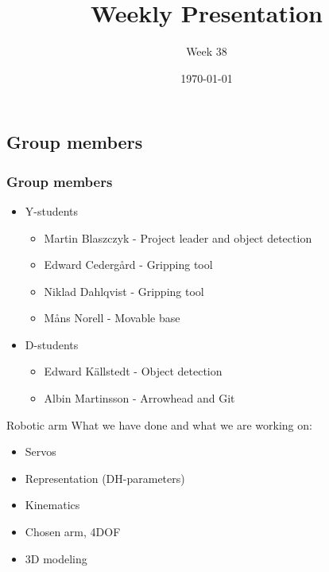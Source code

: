 \documentclass{beamer}
\title{Weekly Presentation}
\subtitle{Week 38}
\author{}
\institute{Luleå University of Technology}
\date{\today}
\begin{document}
\begin{frame}
    \titlepage
\end{frame}




\begin{frame}
    \subsection{Group members}
    \frametitle{Group members }
    \begin{itemize}
        \item Y-students
        \begin{itemize}
            \item Martin Blaszczyk - Project leader and object detection
            \item Edward Cedergård - Gripping tool
            \item Niklad Dahlqvist - Gripping tool
            \item Måns Norell - Movable base
        \end{itemize}
        \item D-students
        \begin{itemize}
            \item Edward Källstedt - Object detection
            \item Albin Martinsson - Arrowhead and Git
        \end{itemize}  
    \end{itemize}
\end{frame}




\begin{frame}{Robotic arm}
What we have done and what we are working on:
    \begin{itemize}
        \item Servos
        \item Representation (DH-parameters)
        \item Kinematics
        \item Chosen arm, 4DOF
        \item 3D modeling
    \end{itemize}
\end{frame}


\end{document}
